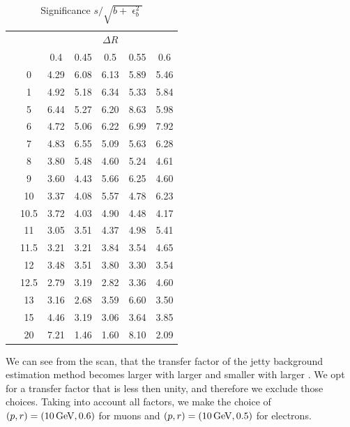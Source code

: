 \begin{table}[!htb]
	\centering
	\label{tab:iso-scan-significance}
		\caption{Significance $s/\sqrt{b+\upvarepsilon^2_b}$}
			\begin{tabular}{cc|ccccc}
    			&\multicolumn{1}{c}{} & \multicolumn{5}{c}{$\Delta R$} \\
    && 0.4 & 0.45 & 0.5 & 0.55 & 0.6 \\
    \cline{2-7}
& 0 & 4.29 & 6.08 & 6.13 & 5.89 & 5.46 \\ 
& 1 & 4.92 & 5.18 & 6.34 & 5.33 & 5.84 \\ 
& 5 & 6.44 & 5.27 & 6.20 & 8.63 & 5.98 \\ 
& 6 & 4.72 & 5.06 & 6.22 & 6.99 & 7.92 \\ 
& 7 & 4.83 & 6.55 & 5.09 & 5.63 & 6.28 \\ 
& 8 & 3.80 & 5.48 & 4.60 & 5.24 & 4.61 \\ 
\smash{\rotatebox[origin=c]{90}{\pt}} & 9 & 3.60 & 4.43 & 5.66 & 6.25 & 4.60 \\ 
& 10 & 3.37 & 4.08 & 5.57 & 4.78 & 6.23 \\ 
& 10.5 & 3.72 & 4.03 & 4.90 & 4.48 & 4.17 \\ 
& 11 & 3.05 & 3.51 & 4.37 & 4.98 & 5.41 \\ 
& 11.5 & 3.21 & 3.21 & 3.84 & 3.54 & 4.65 \\ 
& 12 & 3.48 & 3.51 & 3.80 & 3.30 & 3.54 \\ 
& 12.5 & 2.79 & 3.19 & 2.82 & 3.36 & 4.60 \\ 
& 13 & 3.16 & 2.68 & 3.59 & 6.60 & 3.50 \\ 
& 15 & 4.46 & 3.19 & 3.06 & 3.64 & 3.85 \\ 
& 20 & 7.21 & 1.46 & 1.60 & 8.10 & 2.09 \\ 
  \end{tabular}
\end{table}

We can see from the scan, that the transfer factor of the jetty background estimation method becomes larger with larger \pt and smaller with larger \DR. We opt for a transfer factor that is less then unity, and therefore we exclude those choices. Taking into account all factors, we make the choice of $(p,r)=(10\,\text{Ge\hspace{-.08em}V},0.6)$ for muons and $(p,r)=(10\,\text{Ge\hspace{-.08em}V},0.5)$ for electrons.